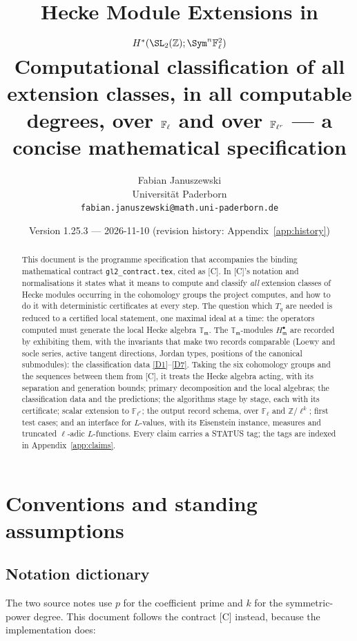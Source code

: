 \documentclass[11pt]{article}
\title{Hecke Module Extensions in $H^\ast(\SL_2(\Z);\Sym^n\Fl^2)$\\[1ex]
\large Computational classification of all extension classes, in all computable degrees, over $\Fl$ and over $\Flr$ --- a concise mathematical specification}
\author{Fabian Januszewski\\ Universit\"at Paderborn\\ \texttt{fabian.januszewski@math.uni-paderborn.de}}
\date{Version 1.25.3 --- 2026-11-10 (revision history: Appendix~\ref{app:history})}
\theoremstyle{remark}
\newcommand{\F}{\mathbb{F}}
\newcommand{\Z}{\mathbb{Z}}
\newcommand{\Fl}{\F_\ell}
\newcommand{\Flr}{\F_{\ell^r}}
\newcommand{\T}{\mathbb{T}}
\newcommand{\m}{\mathfrak{m}}
\begin{document}
\maketitle

\begin{abstract}
This document is the programme specification that accompanies the binding mathematical contract
\texttt{gl2\_contract.tex}, cited as [C]. In [C]'s notation and normalisations it states what it means to
compute and classify \emph{all} extension classes of Hecke modules occurring in the cohomology groups the
project computes, and how to do it with deterministic certificates at every step. The question which
$T_q$ are needed is reduced to a certified local statement, one maximal ideal at a time: the operators
computed must generate the local Hecke algebra $\T_\m$. The $\T_\m$-modules $H^\bullet_\m$ are recorded by
exhibiting them, with the invariants that make two records comparable (Loewy and socle series, active
tangent directions, Jordan types, positions of the canonical submodules): the classification data
\ref{D1}--\ref{D7}. Taking the six cohomology groups and the sequences between them from [C], it treats
the Hecke algebra acting, with its separation and generation bounds; primary decomposition and the local
algebras; the classification data and the predictions; the algorithms stage by stage, each with its
certificate; scalar extension to $\Flr$; the output record schema, over $\Fl$ and $\Z/\ell^{k}$; first
test cases; and an interface for $L$-values, with its Eisenstein instance, measures and truncated
$\ell$-adic $L$-functions. Every claim carries a STATUS tag; the tags are indexed in Appendix~\ref{app:claims}.
\end{abstract}

\tableofcontents

\setcounter{section}{-1}
\section{Conventions and standing assumptions}\label{sec:conv}

\subsection{Notation dictionary}
The two source notes use $p$ for the coefficient prime and $k$ for the symmetric-power
degree. This document follows the contract [C] instead, because the implementation does:
\end{document}

